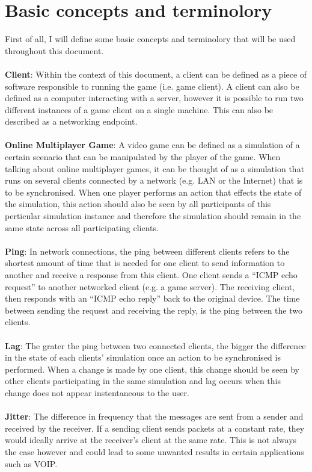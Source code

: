\section{Basic concepts and terminolory}
First of all, I will define some basic concepts and terminolory that will be used throughout this document.
\\
\\
\textbf{Client}: Within the context of this document, a client can be defined as a piece of software responsible to running the game (i.e. game client). A client can also be defined as a computer interacting with a server, however it is possible to run two different instances of a game client on a single machine. This can also be described as a networking endpoint.
\\
\\
\textbf{Online Multiplayer Game}: A video game can be defined as a simulation of a certain scenario that can be manipulated by the player of the game. When talking about online multiplayer games, it can be thought of as a simulation that runs on several clients connected by a network (e.g. LAN or the Internet) that is to be synchronised. When one player performs an action that effects the state of the simulation, this action should also be seen by all participants of this perticular simulation instance and therefore the simulation should remain in the same state across all participating clients.
\\
\\
\textbf{Ping}: In network connections, the ping between different clients refers to the shortest amount of time that is needed for one client to send information to another and receive a response from this client. One client sends a ``ICMP echo request'' to another networked client (e.g. a game server). The receiving client, then responds with an ``ICMP echo reply'' back to the original device. The time between sending the request and receiving the reply, is the ping between the two clients.
\\
\\
\textbf{Lag}: The grater the ping between two connected clients, the bigger the difference in the state of each clients' simulation once an action to be synchronised is performed. When a change is made by one client, this change should be seen by other clients participating in the same simulation and lag occurs when this change does not appear instentaneous to the user.
\\
\\
\textbf{Jitter}: The difference in frequency that the messages are sent from a sender and received by the receiver. If a sending client sends packets at a constant rate, they would ideally arrive at the receiver's client at the same rate. This is not always the case however and could lead to some unwanted results in certain applications such as VOIP.


